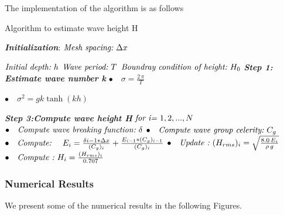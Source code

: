 

The implementation of the algorithm is as follows
\begin{algorithm}
\caption{Algorithm to estimate wave height H}\label{euclid}
\begin{algorithmic}[1]
\Procedure{}{}
\BState \emph{\textit{\textbf{Initialization}}}:
\State $\textit{Mesh spacing:\,\,} \Delta x$

\State $\textit{Initial depth:\,\,} h$
\State $\textit{Wave period:\,\,} T$
\State $\textit{Boundray condition of height:\,\,}H_{0}$
\BState \emph{\textbf{Step 1: Estimate wave number k}}
\State $\bullet \quad\sigma=\frac{2\, \pi}{T}$

\State $\bullet \quad\sigma^2=gk\tanh(kh)$

%
%

\BState \emph{\textbf{Step 3:Compute wave height H}}
\State $\textit{for i=\,\,}1,2,...,N$
\State $\bullet \quad\textit{Compute wave breaking function:\,\,} \delta$
\State $\bullet \quad\textit{Compute wave group celerity:\,\,} C_g$
\State $\bullet \quad\textit{Compute:\,\,} \quad E_{i}=\frac{\delta{i-1}*\Delta x}{(C_g)_{i}}+\frac{E_{i-1}*(C_g)_{i-1}}{(C_g)_{i}}$
\State $\bullet \quad\textit{Update :\,\,} (H_{rms})_{i}=\sqrt{\frac{8.0\,E_{i}}{\rho\, g}}$
\State $\bullet \quad\textit{Compute :\,\,} H_{i}=\frac{(H_{rms})_{i}}{0.707}$
\EndProcedure
\end{algorithmic}
\end{algorithm} 


\subsubsection{Numerical Results}
We present some of the numerical results in the following Figures.

